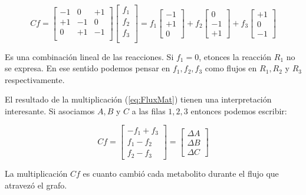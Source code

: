 \documentclass[12pt,spanish]{article}
\begin{document}
\begin{equation}\label{eq:FluxMat}
  Cf =
  \begin{bmatrix}
  -1 &  0 & +1\\
  +1 & -1 & 0\\
  0 & +1 & -1\\
\end{bmatrix}
\begin{bmatrix} f_1\\ f_2\\ f_3\\ \end{bmatrix}
  =
f_1\begin{bmatrix} -1 \\ +1\\ 0 \end{bmatrix}
+ f_2\begin{bmatrix} 0\\ -1\\ +1 \end{bmatrix}
+ f_3\begin{bmatrix} +1\\ 0\\ -1 \end{bmatrix}
\end{equation}

Es una combinación lineal de las reacciones. Si $f_1 = 0$, etonces la reacción $R_1$ no se expresa. En ese sentido podemos pensar en $f_1, f_2, f_3$ como flujos en $R_1, R_2$ y $R_3$ respectivamente.

\par
El resultado de la multiplicación (\ref{eq:FluxMat}) tienen una interpretación interesante.  Si asociamos $A, B$ y $C$ a las filas $1, 2, 3$ entonces podemos escribir:

\begin{equation*}
  Cf =
  \begin{bmatrix}
     -f_1 + f_3\\
    f_1 - f_2\\
    f_2 - f_3
  \end{bmatrix} =
  \begin{bmatrix}
     \Delta A\\
     \Delta B\\
     \Delta C
  \end{bmatrix}
\end{equation*}

La multiplicación $Cf$ es cuanto cambió cada metabolito durante el flujo que atravezó el grafo.
\end{document}
